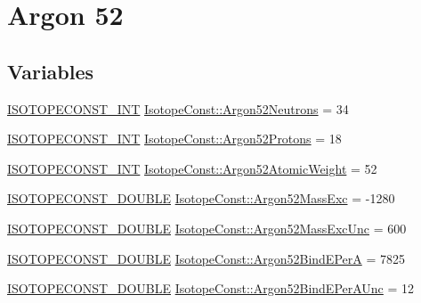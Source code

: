 \hypertarget{group___isotope_const-_argon-_ar52}{}\section{Argon 52}
\label{group___isotope_const-_argon-_ar52}
\subsection*{Variables}
\begin{DoxyCompactItemize}
\item 
\mbox{\hyperlink{group___isotope_const-_macros_ga5f18360b3e99483a35c32d789e62621c}{I\+S\+O\+T\+O\+P\+E\+C\+O\+N\+S\+T\+\_\+\+I\+NT}} \mbox{\hyperlink{group___isotope_const-_argon-_ar52_ga9a656be8edc6b0b18e1e8b9d416d035c}{Isotope\+Const\+::\+Argon52\+Neutrons}} = 34
\item 
\mbox{\hyperlink{group___isotope_const-_macros_ga5f18360b3e99483a35c32d789e62621c}{I\+S\+O\+T\+O\+P\+E\+C\+O\+N\+S\+T\+\_\+\+I\+NT}} \mbox{\hyperlink{group___isotope_const-_argon-_ar52_ga3906bab2cf43e47be803034f268e084c}{Isotope\+Const\+::\+Argon52\+Protons}} = 18
\item 
\mbox{\hyperlink{group___isotope_const-_macros_ga5f18360b3e99483a35c32d789e62621c}{I\+S\+O\+T\+O\+P\+E\+C\+O\+N\+S\+T\+\_\+\+I\+NT}} \mbox{\hyperlink{group___isotope_const-_argon-_ar52_ga8f47a3c1bd7634355743d4265b643d04}{Isotope\+Const\+::\+Argon52\+Atomic\+Weight}} = 52
\item 
\mbox{\hyperlink{group___isotope_const-_macros_ga8f45a7272ce02c0b4c65c44636ed719a}{I\+S\+O\+T\+O\+P\+E\+C\+O\+N\+S\+T\+\_\+\+D\+O\+U\+B\+LE}} \mbox{\hyperlink{group___isotope_const-_argon-_ar52_ga4c164902378f6cdd812f92b884c79bb8}{Isotope\+Const\+::\+Argon52\+Mass\+Exc}} = -\/1280
\item 
\mbox{\hyperlink{group___isotope_const-_macros_ga8f45a7272ce02c0b4c65c44636ed719a}{I\+S\+O\+T\+O\+P\+E\+C\+O\+N\+S\+T\+\_\+\+D\+O\+U\+B\+LE}} \mbox{\hyperlink{group___isotope_const-_argon-_ar52_gad10983872f8d0378d98173b318ee1736}{Isotope\+Const\+::\+Argon52\+Mass\+Exc\+Unc}} = 600
\item 
\mbox{\hyperlink{group___isotope_const-_macros_ga8f45a7272ce02c0b4c65c44636ed719a}{I\+S\+O\+T\+O\+P\+E\+C\+O\+N\+S\+T\+\_\+\+D\+O\+U\+B\+LE}} \mbox{\hyperlink{group___isotope_const-_argon-_ar52_ga3526d89bd710d5689cb8f8e83ac3fbc6}{Isotope\+Const\+::\+Argon52\+Bind\+E\+PerA}} = 7825
\item 
\mbox{\hyperlink{group___isotope_const-_macros_ga8f45a7272ce02c0b4c65c44636ed719a}{I\+S\+O\+T\+O\+P\+E\+C\+O\+N\+S\+T\+\_\+\+D\+O\+U\+B\+LE}} \mbox{\hyperlink{group___isotope_const-_argon-_ar52_ga3011ff10ac898e1fd7fbf9a15c139038}{Isotope\+Const\+::\+Argon52\+Bind\+E\+Per\+A\+Unc}} = 12

\end{DoxyCompactItemize}
